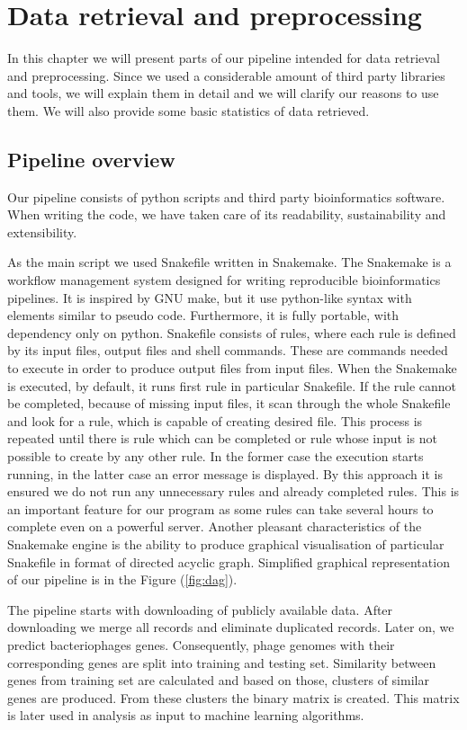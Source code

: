 \chapter{Data retrieval and preprocessing}
In this chapter we will present parts of our pipeline intended for data retrieval and preprocessing.
Since we used a considerable amount of third party libraries and tools, we will explain them in detail and we will clarify our reasons to use them.
We will also provide some basic statistics of data retrieved.

\section{Pipeline overview}
Our pipeline consists of python scripts and third party bioinformatics software.
When writing the code, we have taken care of its readability, sustainability and extensibility.

As the main script we used Snakefile written in Snakemake.
The Snakemake is a workflow management system designed for writing reproducible bioinformatics pipelines.
It is inspired by GNU make, but it use python-like syntax with elements similar to pseudo code.
Furthermore, it is fully portable, with dependency only on python.
Snakefile consists of rules, where each rule is defined by its input files, output files and shell commands.
These are commands needed to execute in order to produce output files from input files.
When the Snakemake is executed, by default, it runs first rule in particular Snakefile. 
If the rule cannot be completed, because of missing input files, it scan through the whole Snakefile and look for a rule, which is capable of creating desired file. 
This process is repeated until there is rule which can be completed or rule whose input is not possible to create by any other rule.
In the former case the execution starts running, in the latter case an error message is displayed.
By this approach it is ensured we do not run any unnecessary rules and already completed rules.
This is an important feature for our program as some rules can take several hours to complete even on a powerful server. 
Another pleasant characteristics of the Snakemake engine is the ability to produce graphical visualisation of particular Snakefile in format of directed acyclic graph.
Simplified graphical representation of our pipeline is in the Figure (\ref{fig:dag}).

The pipeline starts with downloading of publicly available data.
After downloading we merge all records and eliminate duplicated records.
Later on, we predict bacteriophages genes.
Consequently, phage genomes with their corresponding genes are split into training and testing set.
Similarity between genes from training set are calculated and based on those, clusters of similar genes are produced. 
From these clusters the binary matrix is created.
This matrix is later used in analysis as input to machine learning algorithms.

